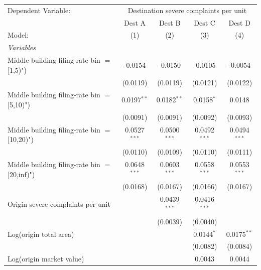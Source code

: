 \begingroup
\centering
\begin{tabular}{lcccc}
   \tabularnewline \midrule \midrule
   Dependent Variable: & \multicolumn{4}{c}{Destination severe complaints per unit}\\
                                                  & Dest A         & Dest B         & Dest C         & Dest D \\   
   Model:                                         & (1)            & (2)            & (3)            & (4)\\  
   \midrule
   \emph{Variables}\\
   Middle building filing-rate bin $=$ [1,5)")    & -0.0154        & -0.0150        & -0.0105        & -0.0054\\   
                                                  & (0.0119)       & (0.0119)       & (0.0121)       & (0.0122)\\   
   Middle building filing-rate bin $=$ [5,10)")   & 0.0197$^{**}$  & 0.0182$^{**}$  & 0.0158$^{*}$   & 0.0148\\   
                                                  & (0.0091)       & (0.0091)       & (0.0092)       & (0.0093)\\   
   Middle building filing-rate bin $=$ [10,20)")  & 0.0527$^{***}$ & 0.0500$^{***}$ & 0.0492$^{***}$ & 0.0494$^{***}$\\   
                                                  & (0.0110)       & (0.0109)       & (0.0110)       & (0.0111)\\   
   Middle building filing-rate bin $=$ [20,inf)") & 0.0648$^{***}$ & 0.0603$^{***}$ & 0.0558$^{***}$ & 0.0553$^{***}$\\   
                                                  & (0.0168)       & (0.0167)       & (0.0166)       & (0.0167)\\   
   Origin severe complaints per unit              &                & 0.0439$^{***}$ & 0.0416$^{***}$ &   \\   
                                                  &                & (0.0039)       & (0.0040)       &   \\   
   Log(origin total area)                         &                &                & 0.0144$^{*}$   & 0.0175$^{**}$\\   
                                                  &                &                & (0.0082)       & (0.0084)\\   
   Log(origin market value)                       &                &                & 0.0043         & 0.0044\\   

\end{tabular}
